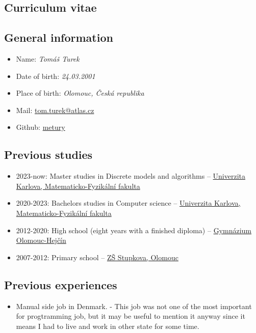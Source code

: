 \documentclass{article}
\begin{document}
\begin{center}
\section*{Curriculum vitae}
\end{center}

\subsection*{General information}

\begin{itemize}
	\item Name: \textit{Tomáš Turek}
	\item Date of birth: \textit{24.03.2001}
	\item Place of birth: \textit{Olomouc, Česká republika}
	\item Mail: \href{mailto:tom.turek@atlas.cz}{tom.turek@atlas.cz}
	\item Github: \href{https://github.com/metury}{metury}
\end{itemize}

\subsection*{Previous studies}

\begin{itemize}
	\item 2023-now: Master studies in Discrete models and algorithms -- \href{https://www.mff.cuni.cz/}{Univerzita Karlova, Matematicko-Fyzikální fakulta}
	\item 2020-2023: Bachelors studies in Computer science -- \href{https://www.mff.cuni.cz/}{Univerzita Karlova, Matematicko-Fyzikální fakulta}
	\item 2012-2020: High school (eight years with a finished diploma) -- \href{https://www.gytool.cz/}{Gymnázium Olomouc-Hejčín}
	\item 2007-2012: Primary school -- \href{https://zsstupkova.cz/}{ZŠ Stupkova, Olomouc}
\end{itemize}

\subsection*{Previous experiences}

\begin{itemize}
	\item Manual side job in Denmark. - This job was not one of the most important for progtramming job, but it may be useful to mention it anyway since it means I had to live and work in other state for some time.
\end{itemize}
\end{document}
